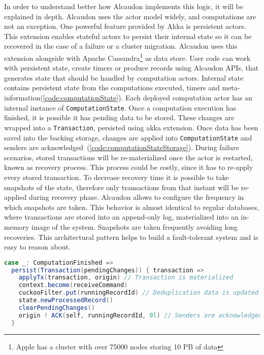 In order to understand better how Alcaudon implements this logic, it will be
explained in depth. Alcaudon uses the actor model widely, and computations are not
an exception. One powerful feature provided by Akka is persistent actors. This
extension enables stateful actors to persist their internal state so it can be
recovered in the case of a failure or a cluster migration. Alcaudon uses this
extension alongside with Apache Cassandra\footnote{Apple has a cluster with over
  75000 nodes storing 10 PB of data} as data store. User code can work with
persistent state, create timers or produce records using Alcaudon \acs{API}s,
that generates state that should be handled by computation actors. Internal
state contains persistent state from the computations executed, timers and
meta-information(\ref{code:computationState}). Each
deployed computation actor has an internal instance of
\lstinline[columns=fixed]{ComputationState}. Once a computation execution has
finished, it is possible it has pending data to be stored. These changes are wrapped
into a \lstinline[columns=fixed]{Transaction}, persisted using akka extension.
Once data has been saved into the backing storage, changes are applied into
\lstinline[columns=fixed]{ComputationState} and senders are
acknowledged~(\ref{code:computationStateStorage}). During failure scenarios, stored
transactions will be re-materialized once the actor is restarted, known as
recovery process. This process could be costly, since it has to re-apply every
stored transaction. To decrease recovery time it is possible to take snapshots
of the state, therefore only transactions from that instant will be re-applied
during recovery phase. Alcaudon allows to configure the frequency in which
snapshots are taken. This behavior is almost identical to regular databases,
where transactions are stored into an append-only log, materialized into an
in-memory image of the system. Snapshots are taken frequently avoiding long
recoveries. This architectural pattern helps to build a fault-tolerant system
and is easy to reason about.

\begin{lstlisting}[language=scala, frame=trBL, label=code:computationStateStorage, float=ht, caption = {Computation state persistence}]
case _: ComputationFinished =>
  persist(Transaction(pendingChanges)) { transaction =>
    applyTx(transaction, origin) // Transaction is materialized
    context.become(receiveCommand)
    cuckooFilter.put(runningRecordId) // Deduplication data is updated
    state.newProcessedRecord()
    clearPendingChanges()
    origin ! ACK(self, runningRecordId, 0l) // Senders are acknowledged
  }
\end{lstlisting}

